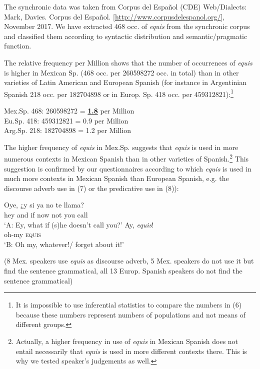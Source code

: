\documentclass[output=paper
,modfonts
,nonflat]{langsci/langscibook}
\begin{document}
The synchronic data was taken from Corpus del Español (\nocite{CDE}CDE) Web/Dialects: Mark, Davies. Corpus del Español. {[}\href{http://www.corpusdelespanol.org/}{http://www.corpusdelespanol.org/}{]}, November 2017. We have extracted 468 occ. of \textit{equis} from the synchronic corpus and classified them according to syntactic distribution and semantic/pragmatic function.

The relative frequency per Million shows that the number of occurrences of \textit{equis} is higher in Mexican Sp. (468 occ. per 260598272 occ. in total) than in other varieties of Latin American and European Spanish (for instance in Argentinian Spanish 218 occ. per 182704898 or in Europ. Sp. 418 occ. per 459312821):\footnote{It is impossible to use inferential statistics to compare the numbers in (6) because these numbers represent numbers of populations and not means of different groups.}

\ea
\glll Mex.Sp. 468: 260598272 = \underline{\textbf{1.8}} per Million\\
Eu.Sp. 418: 459312821 = 0.9 per Million\\
Arg.Sp. 218: 182704898 = 1.2 per Million\\
\z

The higher frequency of \textit{equis} in Mex.Sp. suggests that \textit{equis} is used in more numerous contexts in Mexican Spanish than in other varieties of Spanish.\footnote{Actually, a higher frequency in use of \textit{equis} in Mexican Spanish does not entail necessarily that \textit{equis} is used in more different contexts there. This is why we tested speaker’s judgements as well.}  This suggestion is confirmed by our questionnaires according to which \textit{equis} is used in much more contexts in Mexican Spanish than European Spanish, e.g. the discourse adverb use in (7) or the predicative use in (8)):

\ea
\begin{xlist}
\gll Oye, {¿}y si ya no te llama?\\
hey and if now not you call\\
\glt ‘A: Ey, what if (s)he doesn’t call you?'
Ay, \textit{equis}!\\
oh-my \textsc{equis}\\
\glt ‘B: Oh my, whatever!/ forget about it!’\\
\end{xlist}
(8 Mex. speakers use \textit{equis} as discourse adverb, 5 Mex. speakers do not use it but find the sentence grammatical, all 13 Europ. Spanish speakers do not find the sentence grammatical)
\z
\end{document}
